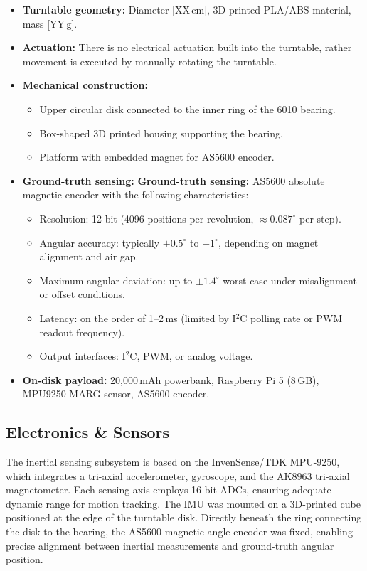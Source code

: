 \documentclass{iutbscthesis}
\begin{document}
\begin{itemize}
    \item \textbf{Turntable geometry:} Diameter [XX\,cm], 3D printed PLA/ABS material, mass [YY\,g].
    \item \textbf{Actuation:} There is no electrical actuation built into the turntable, rather movement is executed by manually rotating the turntable.
    \item \textbf{Mechanical construction:} 
    \begin{itemize}
        \item Upper circular disk connected to the inner ring of the 6010 bearing.
        \item Box-shaped 3D printed housing supporting the bearing.
        \item Platform with embedded magnet for AS5600 encoder.
    \end{itemize}
    \item \textbf{Ground-truth sensing:} \textbf{Ground-truth sensing:} AS5600 absolute magnetic encoder with the following characteristics:
        \begin{itemize}
        \item Resolution: 12-bit (4096 positions per revolution, $\approx 0.087^{\circ}$ per step).
        \item Angular accuracy: typically $\pm 0.5^{\circ}$ to $\pm 1^{\circ}$, depending on magnet alignment and air gap.
        \item Maximum angular deviation: up to $\pm 1.4^{\circ}$ worst-case under misalignment or offset conditions.
        \item Latency: on the order of 1–2\,ms (limited by I$^2$C polling rate or PWM readout frequency).
        \item Output interfaces: I$^2$C, PWM, or analog voltage.
        \end{itemize}    \item \textbf{On-disk payload:} 20,000\,mAh powerbank, Raspberry Pi 5 (8\,GB), MPU9250 MARG sensor, AS5600 encoder.
\end{itemize}


\subsection{Electronics & Sensors}
The inertial sensing subsystem is based on the InvenSense/TDK MPU-9250, which integrates a tri-axial accelerometer, gyroscope, and the AK8963 tri-axial magnetometer. Each sensing axis employs 16-bit ADCs, ensuring adequate dynamic range for motion tracking. The IMU was mounted on a 3D-printed cube positioned at the edge of the turntable disk. Directly beneath the ring connecting the disk to the bearing, the AS5600 magnetic angle encoder was fixed, enabling precise alignment between inertial measurements and ground-truth angular position.
\end{document}
